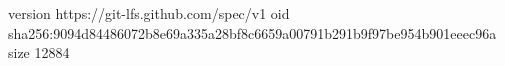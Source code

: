version https://git-lfs.github.com/spec/v1
oid sha256:9094d84486072b8e69a335a28bf8c6659a00791b291b9f97be954b901eeec96a
size 12884
